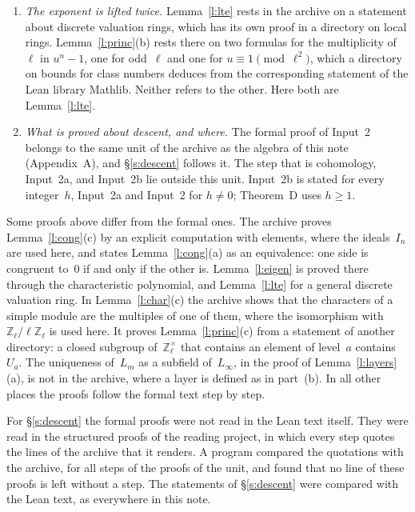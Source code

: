 \documentclass[11pt,a4paper]{article}
\newcommand{\Z}{\mathbb{Z}}
\newcommand{\m}[1]{\mbox{$#1$}}        %
\theoremstyle{plainx}
\theoremstyle{uprightx}
\begin{document}
\begin{enumerate}[label=\textup{\arabic*.},leftmargin=1.6em,itemsep=5pt]
\item \emph{The exponent is lifted twice.} Lemma~\ref{l:lte} rests in the archive on a statement about discrete
valuation rings, which has its own proof in a directory on local rings. Lemma~\ref{l:princ}(b) rests there on two
formulas for the multiplicity of~$\ell$ in \m{u^n-1}, one for odd~$\ell$ and one for \m{u\equiv1\pmod{\ell^2}},
which a directory on bounds for class numbers deduces from the corresponding statement of the Lean library Mathlib.
Neither refers to the other. Here both are Lemma~\ref{l:lte}.
\item \emph{What is proved about descent, and where.} The formal proof of Input~2 belongs to the same unit of the
archive as the algebra of this note (Appendix~A), and §\ref{s:descent} follows it. The step that is cohomology,
Input~2a, and Input~2b lie outside this unit. Input~2b is stated for every integer~$h$, Input~2a and Input~2 for \m{h\ne0};
Theorem~D uses \m{h\ge1}.
\end{enumerate}

Some proofs above differ from the formal ones. The archive proves Lemma~\ref{l:cong}(c) by an explicit
computation with elements, where the ideals~$I_n$ are used here, and states Lemma~\ref{l:cong}(a) as an
equivalence: one side is congruent to~$0$ if and only if the other is. Lemma~\ref{l:eigen} is proved there through
the characteristic polynomial, and Lemma~\ref{l:lte} for a general discrete valuation ring. In
Lemma~\ref{l:char}(c) the archive shows that the characters of a simple module are the multiples of one of them,
where the isomorphism with \m{\Z_\ell/\ell\Z_\ell} is used here. It proves Lemma~\ref{l:princ}(c) from a statement
of another directory: a closed subgroup of~$\Z_\ell^\times$ that contains an element of level~$a$ contains~$U_a$.
The uniqueness of~$L_m$ as a subfield of~$L_\infty$, in the proof of Lemma~\ref{l:layers}(a), is not in the archive,
where a layer is defined as in part~(b). In all other places the proofs follow the formal text step by step.

For §\ref{s:descent} the formal proofs were not read in the Lean text itself. They were read in the structured
proofs of the reading project, in which every step quotes the lines of the archive that it renders. A program
compared the quotations with the archive, for all \UnitSteps{} steps of the \UnitProofs{} proofs of the unit, and
found that no line of these proofs is left without a step. The statements of §\ref{s:descent} were compared with
the Lean text, as everywhere in this note.
\end{document}
